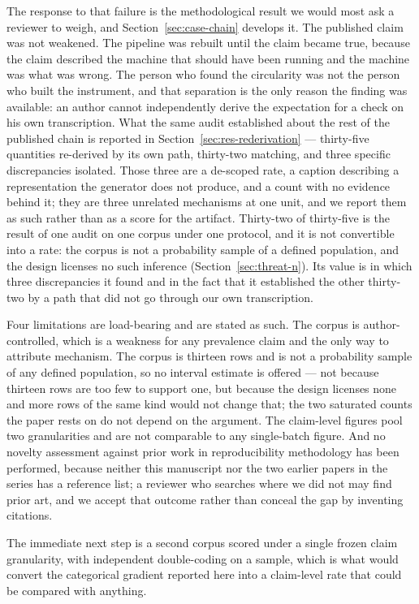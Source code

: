 \documentclass[sigconf,review]{acmart}
\begin{document}
The response to that failure is the methodological result we would most ask a
reviewer to weigh, and Section~\ref{sec:case-chain} develops it. The published
claim was not weakened. The pipeline was rebuilt until the claim became true,
because the claim described the machine that should have been running and the
machine was what was wrong. The person who found the circularity was not the
person who built the instrument, and that separation is the only reason the
finding was available: an author cannot independently derive the expectation
for a check on his own transcription. What the same audit established about the
rest of the published chain is reported in Section~\ref{sec:res-rederivation}
--- thirty-five quantities re-derived by its own path, thirty-two matching, and
three specific discrepancies isolated. Those three are a de-scoped rate, a
caption describing a representation the generator does not produce, and a count
with no evidence behind it; they are three unrelated mechanisms at one unit, and
we report them as such rather than as a score for the artifact. Thirty-two of
thirty-five is the result of one audit on one corpus under one protocol, and it
is not convertible into a rate: the corpus is not a probability sample of a
defined population, and the design licenses no such inference
(Section~\ref{sec:threat-n}). Its value is in which three discrepancies it
found and in the fact that it established the other thirty-two by a path that
did not go through our own transcription.

Four limitations are load-bearing and are stated as such. The corpus is
author-controlled, which is a weakness for any prevalence claim and the only
way to attribute mechanism. The corpus is thirteen rows and is not a
probability sample of any defined population, so no interval estimate is
offered --- not because thirteen rows are too few to support one, but because
the design licenses none and more rows of the same kind would not change that;
the two saturated counts the paper rests on do not depend on the argument.
The claim-level figures pool
two granularities and are not comparable to any single-batch figure. And no
novelty assessment against prior work in reproducibility methodology has been
performed, because neither this manuscript nor the two earlier papers in the
series has a reference list; a reviewer who searches where we did not may find
prior art, and we accept that outcome rather than conceal the gap by inventing
citations.

The immediate next step is a second corpus scored under a single frozen claim
granularity, with independent double-coding on a sample, which is what would
convert the categorical gradient reported here into a claim-level rate that
could be compared with anything.
\end{document}
